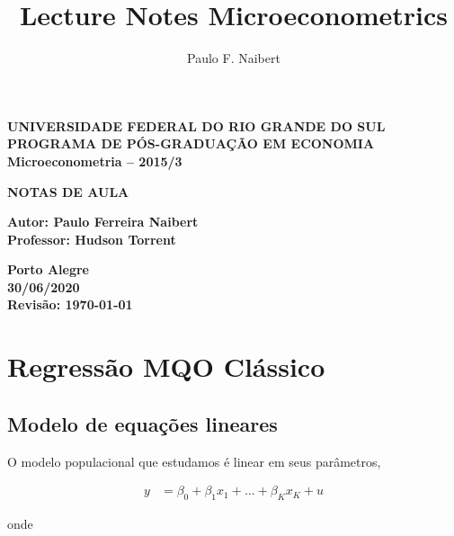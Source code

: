 \documentclass[11pt,oneside,a4paper]{article}
\numberwithin{equation}{section}
\begin{document}
\title{Lecture Notes Microeconometrics}
\author{Paulo F. Naibert}

\thispagestyle{empty}

\begin{center}
\textbf{UNIVERSIDADE FEDERAL DO RIO GRANDE DO SUL}
\\
\textbf{PROGRAMA DE PÓS-GRADUAÇÃO EM ECONOMIA}
\\
\textbf{Microeconometria -- 2015/3}

\vfill
\textbf{NOTAS DE AULA}

\vfill
\textbf{Autor: Paulo Ferreira Naibert } 
\\
\textbf{Professor: Hudson Torrent} 


\end{center}

\vfill

\begin{center}
\textbf{Porto Alegre \\ 30/06/2020 \\ Revisão: \today}
\end{center}

\clearpage
{}

\section{Regressão MQO Clássico}
\noindent
\cite[C.4 -- The Single-Equation Linear Model and OLS Estimation]{wool-2010}

\subsection*{Modelo de equações lineares} 

O modelo populacional que estudamos é linear em seus parâmetros,

\vspace{-1 em}
\begin{align*}
y &= \beta_{0} + \beta_{1} x_{1} + \dots + \beta_{K} x_{K} + u
\end{align*}
\vspace{-1 em}

\noindent
onde
\end{document}
